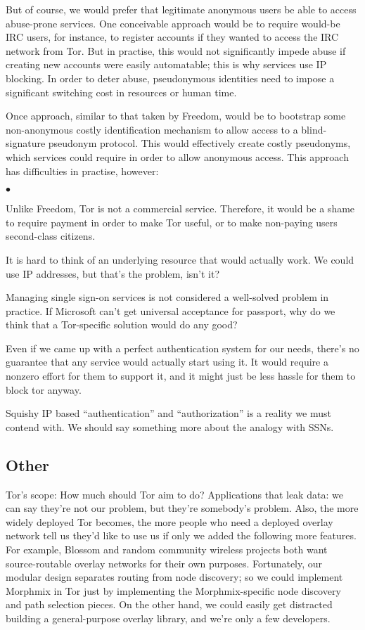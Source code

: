 \documentclass{llncs}
\newenvironment{tightlist}{\begin{list}{$\bullet$}{
  \setlength{\itemsep}{0mm}
    \setlength{\parsep}{0mm}
    }}{\end{list}}
\begin{document}
But of course, we would prefer that legitimate anonymous users be able to
access abuse-prone services.  One conceivable approach would be to require
would-be IRC users, for instance, to register accounts if they wanted to
access the IRC network from Tor.  But in practise, this would not
significantly impede abuse if creating new accounts were easily automatable;
this is why services use IP blocking.  In order to deter abuse, pseudonymous
identities need to impose a significant switching cost in resources or human
time.

Once approach, similar to that taken by Freedom, would be to bootstrap some
non-anonymous costly identification mechanism to allow access to a
blind-signature pseudonym protocol.  This would effectively create costly
pseudonyms, which services could require in order to allow anonymous access.
This approach has difficulties in practise, however:
\begin{tightlist}
\item Unlike Freedom, Tor is not a commercial service.  Therefore, it would
  be a shame to require payment in order to make Tor useful, or to make
  non-paying users second-class citizens.
\item It is hard to think of an underlying resource that would actually work.
  We could use IP addresses, but that's the problem, isn't it?
\item Managing single sign-on services is not considered a well-solved
  problem in practice.  If Microsoft can't get universal acceptance for
  passport, why do we think that a Tor-specific solution would do any good?
\item Even if we came up with a perfect authentication system for our needs,
  there's no guarantee that any service would actually start using it.  It
  would require a nonzero effort for them to support it, and it might just
  be less hassle for them to block tor anyway.
\end{tightlist}

Squishy IP based ``authentication'' and ``authorization'' is a reality
we must contend with. We should say something more about the analogy
with SSNs.



\subsection{Other}

Tor's scope: How much should Tor aim to do? Applications that leak
data: we can say they're not our problem, but they're somebody's problem.
Also, the more widely deployed Tor becomes, the more people who need a
deployed overlay network tell us they'd like to use us if only we added
the following more features. For example, Blossom \cite{blossom} and
random community wireless projects both want source-routable overlay
networks for their own purposes. Fortunately, our modular design separates
routing from node discovery; so we could implement Morphmix in Tor just
by implementing the Morphmix-specific node discovery and path selection
pieces. On the other hand, we could easily get distracted building a
general-purpose overlay library, and we're only a few developers.
\end{document}
